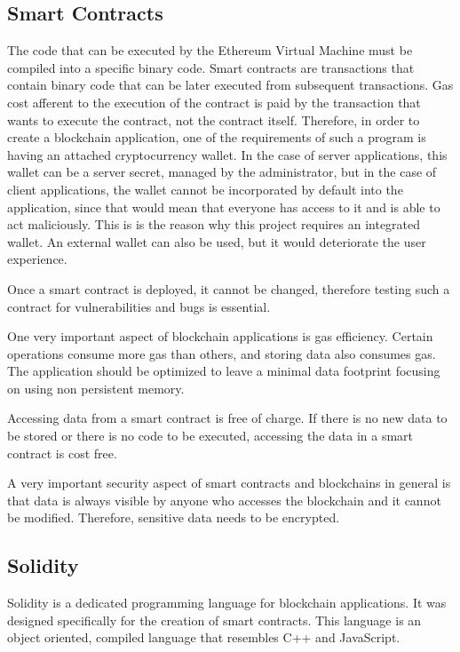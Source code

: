 \documentclass[a4paper,12pt]{report}
\begin{document}
\subsection{Smart Contracts}

The code that can be executed by the Ethereum Virtual Machine must be compiled
into a specific binary code. Smart contracts are transactions that contain
binary code that can be later executed from subsequent transactions. Gas cost
afferent to the execution of the contract is paid by the transaction that wants
to execute the contract, not the contract itself. Therefore, in order to create
a blockchain application, one of the requirements of such a program is having
an attached cryptocurrency wallet. In the case of server applications, this
wallet can be a server secret, managed by the administrator, but in the case of
client applications, the wallet cannot be incorporated by default into the
application, since that would mean that everyone has access to it and is able
to act maliciously. This is is the reason why this project requires an
integrated wallet. An external wallet can also be used, but it would
deteriorate the user experience.

Once a smart contract is deployed, it cannot be changed, therefore testing such
a contract for vulnerabilities and bugs is essential.

One very important aspect of blockchain applications is gas efficiency. Certain
operations consume more gas than others, and storing data also consumes gas.
The application should be optimized to leave a minimal data footprint focusing
on using non persistent memory.

Accessing data from a smart contract is free of charge. If there is no new data
to be stored or there is no code to be executed, accessing the data in a smart
contract is cost free.

A very important security aspect of smart contracts and blockchains in general
is that data is always visible by anyone who accesses the blockchain and it
cannot be modified. Therefore, sensitive data needs to be encrypted.

\subsection{Solidity}

Solidity\cite{solidityDocs} is a dedicated programming language for blockchain
applications. It was designed specifically for the creation of smart contracts.
This language is an object oriented, compiled language that resembles C++ and
JavaScript.
\end{document}
